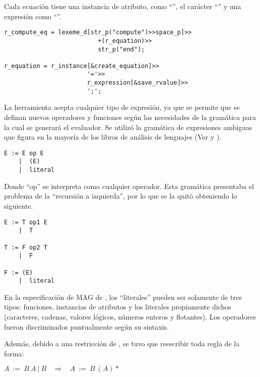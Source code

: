 Cada ecuación tiene una instancia de atributo, como ``'', el carácter ``\textbtt{=}'' y una expresión como ``''.

\begin{lstlisting}[columns=fullflexible, linewidth=10cm]
r_compute_eq = lexeme_d[str_p("compute")>>space_p]>>
                          +(r_equation)>>
                          str_p("end");

r_equation = r_instance[&create_equation]>>
                       '='>>
                       r_expression[&save_rvalue]>>
                       ';';
\end{lstlisting}

La herramienta acepta cualquier tipo de expresión, ya que se permite que se definan nuevos operadores y funciones según las necesidades de la gramática para la cual se generará el evaluador. Se utilizó la gramática de expresiones ambiguas que figura en la mayoría de los libros de análisis de lenguajes (Ver \cite{gramatica} y \cite{compiladores}).

\begin{lstlisting}[basicstyle=\normalsize, backgroundcolor=\color{white}, columns=fullflexible, linewidth=7cm]
E := E op E
    |  (E)
    |  literal
\end{lstlisting}

Donde ``op'' se interpreta como cualquier operador. Esta gramática presentaba el problema de la ``recursión a izquierda'', por lo que se la quitó obteniendo lo siguiente.

\begin{lstlisting}[basicstyle=\normalsize, backgroundcolor=\color{white}, columns=fullflexible, linewidth=7cm]
E := T op1 E
    |  T

T := F op2 T
    |  F

F := (E)
    |  literal
\end{lstlisting}

En la especificación de MAG de \maggen, los ``literales'' pueden ser solamente de tres tipos: funciones, instancias de atributos y los literales propiamente dichos (caracteres, cadenas, valores lógicos, números enteros y flotantes). Los operadores fueron discriminados puntualmente según su sintaxis.

Además, debido a una restricción de \spirit, se tuvo que reescribir toda regla de la forma:

\begin{center}\textbf{\large{$A\ :=\ B\ A\ |\ B\ \ \ \ \Rightarrow\ \ \ \ A\ :=\ B\ (A)*$}}\end{center}

